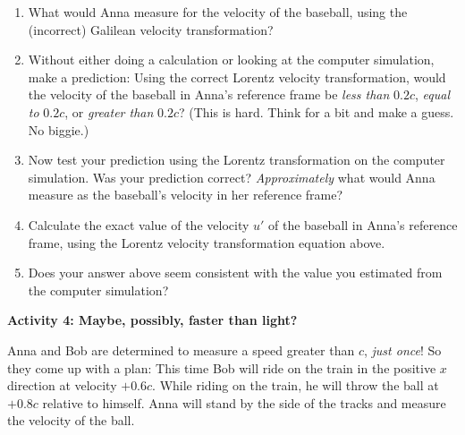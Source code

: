\begin{enumerate}[labparts]
\item What would Anna measure for the velocity of the baseball, using the (incorrect) Galilean velocity transformation?
\answerspace{0.5in}

\item Without either doing a calculation or looking at the computer simulation, make a prediction: Using the correct Lorentz velocity transformation, would the velocity of the baseball in Anna's reference frame be \textit{less than} $0.2c$, \textit{equal to} $0.2c$, or \textit{greater than} $0.2c$?  (This is hard.  Think for a bit and make a guess.  No biggie.)
\answerspace{0.5in}

\item Now test your prediction using the Lorentz transformation on the computer simulation.  Was your prediction correct?  \textit{Approximately} what would Anna measure as the baseball's velocity in her reference frame?
\answerspace{0.5in}

\item Calculate the exact value of the velocity $u'$ of the baseball in Anna's reference frame, using the Lorentz velocity transformation equation above.
\answerspace{1.5in}

\item Does your answer above seem consistent with the value you estimated from the computer simulation?
\answerspace{0.5in}
\end{enumerate}

\textbf{Activity 4: Maybe, possibly, faster than light?}

Anna and Bob are determined to measure a speed greater than $c$, \textit{just once}!  So they come up with a plan: This time Bob will ride on the train in the positive $x$ direction at velocity $+0.6c$.  While riding on the train, he will throw the ball at $+0.8c$ relative to himself.  Anna will stand by the side of the tracks and measure the velocity of the ball.

